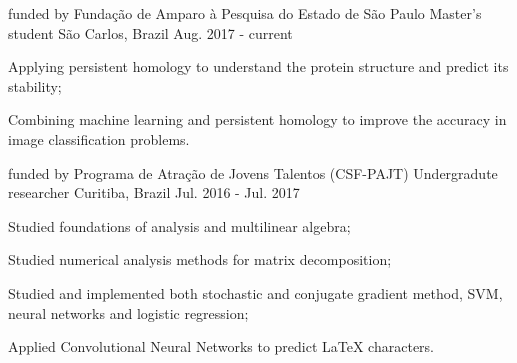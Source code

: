 

\begin{cventries}

  \cventry
    {funded by Fundação de Amparo à Pesquisa do Estado de São Paulo} %
    {Master's student} %
    {São Carlos, Brazil} %
    {Aug. 2017 - current} %
    {
      \begin{cvitems} %
        \item {Applying persistent homology to understand the protein structure
        and predict its stability;}
        \item {Combining machine learning and persistent homology to improve
        the accuracy in image classification problems.}
      \end{cvitems}
    }

\cventry
  {funded by Programa de Atração de Jovens Talentos (CSF-PAJT)} %
  {Undergradute researcher} %
  {Curitiba, Brazil} %
  {Jul. 2016 - Jul. 2017} %
  {
    \begin{cvitems} %
      \item {Studied foundations of analysis and multilinear algebra;}
      \item {Studied numerical analysis methods for matrix decomposition;}
      \item {Studied and implemented both stochastic and conjugate gradient
      method, SVM, neural networks and logistic regression;}
      \item {Applied Convolutional Neural Networks to predict LaTeX characters.}
    \end{cvitems}
  }

\end{cventries}
